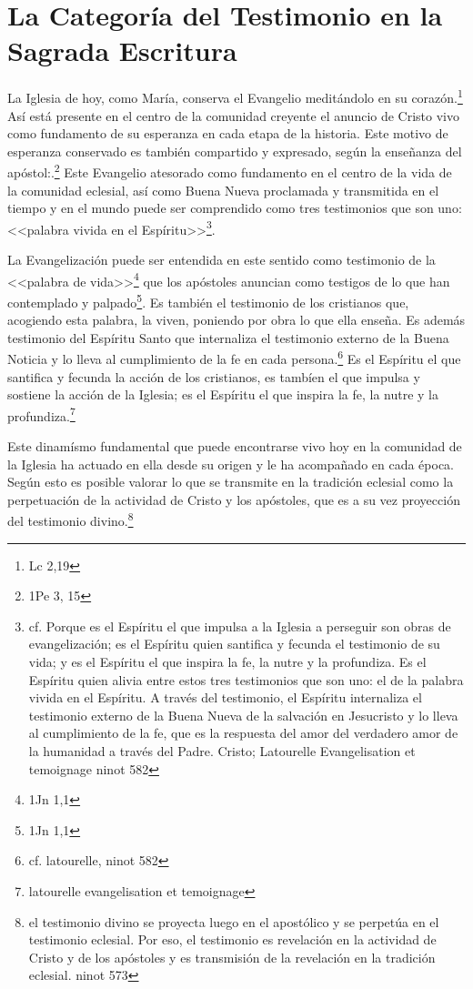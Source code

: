 \section{La Categoría del Testimonio en la Sagrada Escritura}
La Iglesia de hoy, como María, conserva el Evangelio meditándolo en su
corazón.\footnote{Lc 2,19} Así está presente en el centro de la comunidad
creyente el anuncio de Cristo vivo como fundamento de su esperanza en cada etapa
de la historia. Este motivo de esperanza conservado es también compartido y
expresado, según la enseñanza del apóstol:.\footnote{1Pe 3, 15} Este Evangelio
atesorado como fundamento en el centro de la vida de la comunidad eclesial, así
como Buena Nueva proclamada y transmitida en el tiempo y en el mundo puede ser
comprendido como tres testimonios que son uno:<<palabra vivida en el
Espíritu>>\footnote{cf. Porque es el Espíritu el que impulsa a la Iglesia a
  perseguir son obras de evangelización; es el Espíritu quien santifica y
  fecunda el testimonio de su vida; y es el Espíritu el que inspira la fe, la
  nutre y la profundiza. Es el Espíritu quien alivia entre estos tres
  testimonios que son uno: el de la palabra vivida en el Espíritu. A través del
  testimonio, el Espíritu internaliza el testimonio externo de la Buena Nueva de
  la salvación en Jesucristo y lo lleva al cumplimiento de la fe, que es la
  respuesta del amor del verdadero amor de la humanidad a través del Padre.
  Cristo; Latourelle Evangelisation et temoignage ninot 582}.

La Evangelización puede ser entendida en este sentido como testimonio de la
<<palabra de vida>>\footnote{1Jn 1,1} que los apóstoles anuncian como testigos
de lo que han contemplado y palpado\footnote{1Jn 1,1}. Es también el testimonio
de los cristianos que, acogiendo esta palabra, la viven,
poniendo por obra lo que ella enseña. Es además testimonio del Espíritu Santo
que internaliza el testimonio externo de la Buena Noticia y lo lleva al
cumplimiento de la fe en cada persona.\footnote{cf. latourelle, ninot 582} Es el
Espíritu el que santifica y fecunda la acción de los cristianos, es tambíen el
que impulsa y sostiene la acción de la Iglesia; es el Espíritu el que inspira la
fe, la nutre y la profundiza.\footnote{latourelle evangelisation et temoignage}

Este dinamísmo fundamental que puede encontrarse vivo hoy en la comunidad de la
Iglesia ha actuado en ella desde su origen y le ha acompañado en cada época.
Según esto es posible valorar lo que se transmite en la tradición eclesial como
la perpetuación de la actividad de Cristo y los apóstoles, que es a su vez
proyección del testimonio divino.\footnote{ el testimonio divino se proyecta
  luego en el apostólico y se perpetúa en el testimonio eclesial. Por eso, el
  testimonio es revelación en la actividad de Cristo y de los apóstoles y es
  transmisión de la revelación en la tradición eclesial. ninot 573}

